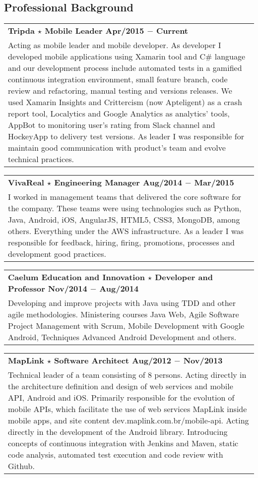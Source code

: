 \documentclass[a4paper, oneside, final]{scrartcl}
\newcommand{\vspc}{\vspace{0.15cm}} %
\begin{document}
\begin{center}
\section{Professional Background}
\begin{tabularx}{1\linewidth}{X}
{\bf Tripda $\star$ Mobile Leader \hfill Apr/2015 $-$ Current} \\
Acting as mobile leader and mobile developer. As developer I developed mobile applications using Xamarin tool and C\# language and our development process include automated tests in a gamified continuous integration environment, small feature branch, code review and refactoring, manual testing and versions releases. We used Xamarin Insights and Crittercism (now Apteligent) as a crash report tool, Localytics and Google Analytics as analytics' tools, AppBot to monitoring user's rating from Slack channel and HockeyApp to delivery test versions. As leader I was responsible for maintain good communication with product's team and evolve technical practices. \vspc\\
\end{tabularx}

\begin{tabularx}{1\linewidth}{X}
{\bf VivaReal $\star$ Engineering Manager \hfill Aug/2014 $-$ Mar/2015} \\
I worked in management teams that delivered the core software for the company. These teams were using technologies such as Python, Java, Android, iOS, AngularJS, HTML5, CSS3, MongoDB, among others. Everything under the AWS infrastructure. As a leader I was responsible for feedback, hiring, firing, promotions, processes and development good practices. \vspc\\
\end{tabularx}

\begin{tabularx}{1\linewidth}{X}
{\bf Caelum Education and Innovation $\star$ Developer and Professor \hfill Nov/2014 $-$ Aug/2014} \\
Developing and improve projects with Java using TDD and other agile methodologies. Ministering courses Java Web, Agile Software Project Management with Scrum, Mobile Development with Google Android, Techniques Advanced Android Development and others. \vspc\\
\end{tabularx}

\begin{tabularx}{1\linewidth}{X}
{\bf MapLink $\star$ Software Architect \hfill Aug/2012 $-$ Nov/2013} \\
Technical leader of a team consisting of 8 persons. Acting directly in the architecture definition and design of web services and mobile API, Android and iOS. Primarily responsible for the evolution of mobile APIs, which facilitate the use of web services MapLink inside mobile apps, and site content dev.maplink.com.br/mobile-api. Acting directly in the development of the Android library. Introducing concepts of continuous integration with Jenkins and Maven, static code analysis, automated test execution and code review with Github. \vspc\\
\end{tabularx}


\end{center}
\end{document}
